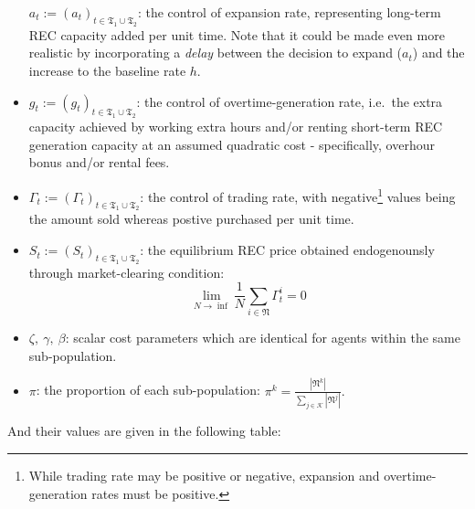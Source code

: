 \documentclass{article}
\begin{document}
\begin{itemize}
  \(a_t := (a_t)_{t\in\mathfrak{T_1} \cup \mathfrak{T_2}}\): the control
  of expansion rate, representing long-term REC capacity added per unit
  time. Note that it could be made even more realistic by incorporating
  a \emph{delay} between the decision to expand (\(a_t\)) and the
  increase to the baseline rate \(h\).
\item
  \(g_t := (g_t)_{t\in\mathfrak{T_1} \cup \mathfrak{T_2}}\): the control
  of overtime-generation rate, i.e.~the extra capacity achieved by
  working extra hours and/or renting short-term REC generation capacity
  at an assumed quadratic cost - specifically, overhour bonus and/or
  rental fees.
\item
  \(\Gamma_t := (\Gamma_t)_{t\in\mathfrak{T_1} \cup \mathfrak{T_2}}\):
  the control of trading rate, with negative\footnote{While trading rate
    may be positive or negative, expansion and overtime-generation rates
    must be positive.} values being the amount sold whereas postive
  purchased per unit time.
\item
  \(S_t := (S_t)_{t\in\mathfrak{T_1} \cup \mathfrak{T_2}}\): the
  equilibrium REC price obtained endogenounsly through market-clearing
  condition:
  \[\lim\limits_{N \to \inf}{\frac{1}{N} \sum\limits_{i\in\mathfrak{N}}{\Gamma^i_t}}=0\]
\item
  \(\zeta,~\gamma,~\beta\): scalar cost parameters which are identical
  for agents within the same sub-population.
\item
  \(\pi\): the proportion of each sub-population:
  \(\pi^k=\frac{|\mathfrak{N}^k|}{\sum\limits_{j \in \mathcal{K}}{|\mathfrak{N}^j|}}.\)
\end{itemize}

And their values are given in the following table:
\end{document}
